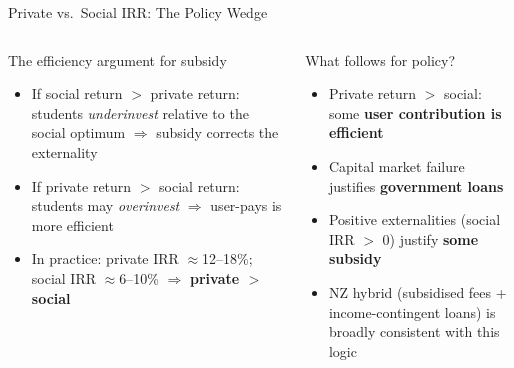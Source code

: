 \documentclass[aspectratio=169, 12pt]{beamer}
\begin{document}
\begin{frame}{Private vs.\ Social IRR: The Policy Wedge}
  \begin{columns}
      \begin{block}{The efficiency argument for subsidy}
        \footnotesize
        \begin{itemize}
          \item If social return $>$ private return: students \emph{underinvest} relative to the
                social optimum $\Rightarrow$ subsidy corrects the externality
          \item If private return $>$ social return: students may \emph{overinvest} $\Rightarrow$
                user-pays is more efficient
          \item In practice: private IRR $\approx$12--18\%; social IRR $\approx$6--10\%
                $\Rightarrow$ \textbf{private $>$ social}
        \end{itemize}
      \end{block}
      \begin{alertblock}{What follows for policy?}
        \footnotesize
        \begin{itemize}
          \item Private return $>$ social: some \textbf{user contribution is efficient}
          \item Capital market failure justifies \textbf{government loans}
          \item Positive externalities (social IRR $>$ 0) justify \textbf{some subsidy}
          \item NZ hybrid (subsidised fees + income-contingent loans) is broadly consistent with this logic
        \end{itemize}
      \end{alertblock}
  \end{columns}
\end{frame}
\end{document}
